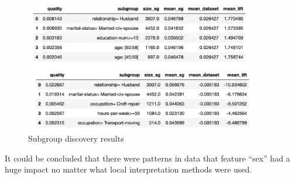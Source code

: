 \begin{figure}[H]
	\includegraphics[width=0.9\textwidth]{imgs/adult_subgroup.png}
	\caption{Subgroup discovery results}
	\label{fig:adult_subgroup}
\end{figure}

It could be concluded that there were patterns in data that feature “sex” had a huge impact no matter what local interpretation methods were used. 
